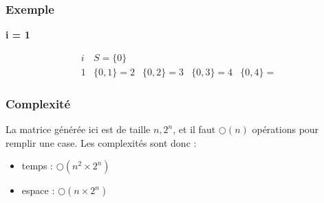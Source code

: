 \subsubsection{Exemple}

{\bf i = 1}\\
\begin{center}
$$\begin{array}{|c|c|c|c|c|c|c|} \hline
	i & S = \{0\} \\ \hline
	1 & \{0,1\} = 
	2 & \{0,2\} = 
	3 & \{0,3\} =
	4 & \{0,4\} =
\end{array}$$
\end{center}

\subsubsection{Complexité}
La matrice générée ici est de taille $n,2^n$, et il faut $\bigcirc(n)$ opérations pour remplir une case.
Les complexités sont donc :
\begin{itemize}
	\item temps : $\bigcirc(n^2\times 2^n)$
	\item espace : $\bigcirc(n\times 2^n)$
\end{itemize}

